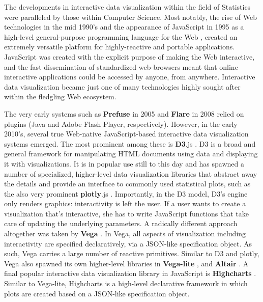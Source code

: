\documentclass[12pt,a4paper]{article}
\begin{document}
The developments in interactive data visualization within the field of Statistics were paralleled by those within Computer Science. Most notably, the rise of Web technologies in the mid 1990's and the appearance of JavaScript in 1995 as a high-level general-purpose programming language for the Web \citep[for a description of the history, see e.g.][]{wirfs-brock2020}, created an extremely versatile platform for highly-reactive and portable applications. JavaScript was created with the explicit purpose of making the Web interactive, and the fast dissemination of standardized web-browsers meant that online interactive applications could be accessed by anyone, from anywhere. Interactive data visualization became just one of many technologies highly sought after within the fledgling Web ecosystem. 

The very early systems such as \textbf{Prefuse} in 2005 \citep{heer2005} and \textbf{Flare} in 2008 \citep{flare2020} relied on plugins (Java and Adobe Flash Player, respectively). However, in the early 2010's, several true Web-native JavaScript-based interactive data visualization systems emerged. The most prominent among these is \textbf{D3}.js \citep{bostock2011}. D3 is a broad and general framework for manipulating HTML documents using data and displaying it with visualizations. It is in popular use still to this day and has spawned a number of specialized, higher-level data visualization libraries that abstract away the details and provide an interface to commonly used statistical plots, such as the also very prominent \textbf{plotly}.js \citep{plotly2022}. Importantly, in the D3 model, D3's engine only renders graphics: interactivity is left the user. If a user wants to create a visualization that's interactive, she has to write JavaScript functions that take care of updating the underlying parameters. A radically different approach altogether was taken by \textbf{Vega} \citep{satyanarayan2015}. In Vega, all aspects of visualization including interactivity are specified declaratively, via a JSON-like specification object. As such, Vega carries a large number of reactive primitives. Similar to D3 and plotly, Vega also spawned its own higher-level libraries in \textbf{Vega-lite} \citep{satyanarayan2016}, and \textbf{Altair} \citep{vanderplas2018}. A final popular interactive data visualization library in JavaScript is \textbf{Highcharts} \citep{highcharts2023}. Similar to Vega-lite, Highcharts is a high-level declarative framework in which plots are created based on a JSON-like specification object. 
\end{document}

